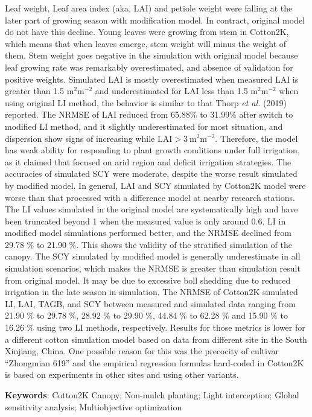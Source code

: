 \begin{spacing}{}
Leaf weight, Leaf area index (aka. LAI) and petiole weight were falling at the later part of growing season with modification model.
In contract, original model do not have this decline.
Young leaves were growing from stem in Cotton2K, which means that when leaves emerge, stem weight will minus the weight of them.
Stem weight goes negative in the simulation with original model because leaf growing rate was remarkably overestimated,
and absence of validation for positive weights.
Simulated LAI is mostly overestimated when measured LAI is greater than 1.5 $\mathrm{m^2 m^{-2}}$ and underestimated
for LAI less than 1.5 $\mathrm{m^2 m^{-2}}$ when using original LI method, the behavior is similar to that
Thorp \textit{et al.} (2019) reported.
The NRMSE of LAI reduced from 65.88\% to 31.99\% after switch to modified LI method, and it slightly underestimated for
most situation, and dispersion show signs of increasing while $\mathrm{LAI > 3\ m^2 m^{-2}}$.
Therefore, the model has weak ability for responding to plant growth conditions under full irrigation, as it claimed
that focused on arid region and deficit irrigation strategies.
The accuracies of simulated SCY were moderate, despite the worse result simulated by modified model.
In general, LAI and SCY simulated by Cotton2K model were worse than that processed with a difference model at nearby
research stations.
The LI values simulated in the original model are systematically high and have been truncated beyond 1 when the measured value is only around 0.6.
LI in modified model simulations performed better, and the NRMSE declined from 29.78 \% to 21.90 \%.
This shows the validity of the stratified simulation of the canopy.
The SCY simulated by modified model is generally underestimate in all simulation scenarios, which makes the NRMSE is
greater than simulation result from original model.
It may be due to excessive boll shedding due to reduced irrigation in the late season in simulation.
The NRMSE of Cotton2K simulated LI, LAI, TAGB, and SCY between measured and simulated data ranging from
21.90 \% to 29.78 \%, 28.92 \% to 29.90 \%, 44.84 \% to 62.28 \% and 15.90 \% to 16.26 \% using two LI methods, respectively.
Results for those metrics is lower for a different cotton simulation model based on data from different site in the South Xinjiang, China.
One possible reason for this was the precocity of cultivar ``Zhongmian 619'' and the empirical regression formulas hard-coded in Cotton2K
is based on experiments in other sites and using other variants.

\textbf{Keywords}: Cotton2K Canopy; Non-mulch planting; Light interception; Global sensitivity analysis; Multiobjective optimization
\end{spacing}
